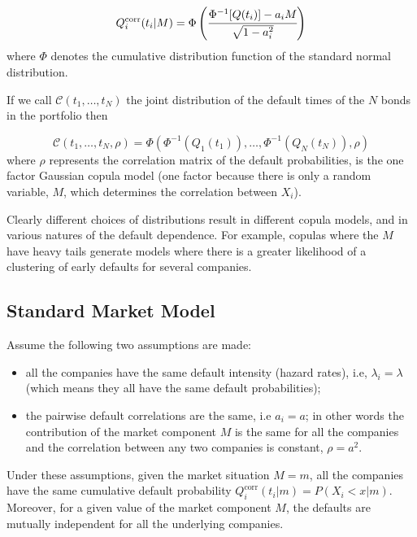 \begin{equation}
Q_i^{\textrm{corr}}(t_i|M) = \Phi\left(\cfrac{\Phi^{-1}[Q(t_i)]-a_i M}{\sqrt{1-a_i^2}}\right)
\label{eq:gaussian_one_factor_copula}
\end{equation}
where $\Phi$ denotes the cumulative distribution function of the standard normal distribution.

If we call $\mathcal{C}(t_1,\ldots,t_N)$ the joint distribution of the default times of the $N$ bonds in the portfolio then

\begin{equation}
\mathcal{C}(t_1,\ldots,t_N, \rho)=\Phi(\Phi^{-1}(Q_1(t_1)),\ldots,\Phi^{-1}(Q_N(t_N)), \rho)
\end{equation}
where $\rho$ represents the correlation matrix of the default probabilities, is the one factor Gaussian copula model (one factor because there is only a random variable, $M$, which determines the correlation between $X_i$).

Clearly different choices of distributions result in different copula models, and in various natures of the default dependence. For example, copulas where the \(M\) have heavy tails generate models where there is a
greater likelihood of a clustering of early defaults for several
companies.

\subsection{Standard Market Model}\label{standard-market-model}

Assume the following two assumptions are made:

\begin{itemize}
	\tightlist
	\item
	all the companies have the same default intensity (hazard rates), i.e, \(\lambda_i = \lambda\) (which means they all have the same default probabilities);
	\item
	the pairwise default correlations are the same, i.e \(a_i = a\); in other words the contribution of the market
	component $M$ is the same for all the companies and the correlation between any two companies is constant, \(\rho = a^2\).
\end{itemize}

Under these assumptions, given the market situation \(M = m\), all the
companies have the same cumulative default probability
\(Q_i^{\textrm{corr}}(t_i|m)=P(X_i < x|m)\). 
Moreover, for a given value of the
market component \(M\), the defaults are mutually independent for all
the underlying companies. 

